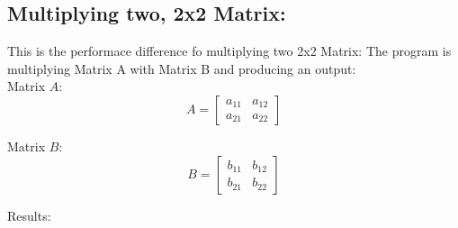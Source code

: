 \documentclass{article}
\begin{document}
\subsection*{Multiplying two, 2x2 Matrix:}
This is the performace difference fo multiplying two 2x2 Matrix:
The program is multiplying Matrix A with Matrix B and producing an output: \\

Matrix \( A \):
\[
A = \begin{bmatrix}
a_{11} & a_{12} \\
a_{21} & a_{22}
\end{bmatrix}
\]

Matrix \( B \):
\[
B = \begin{bmatrix}
b_{11} & b_{12} \\
b_{21} & b_{22}
\end{bmatrix}
\]

Results:
\noindent
{} \\
\end{document}
